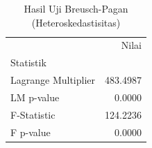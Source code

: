 \begin{table}[H]
\centering
\caption{Hasil Uji Breusch-Pagan (Heteroskedastisitas)}
\label{tab:bp_test}
\footnotesize
\begin{tabular}{lr}
\toprule
 & Nilai \\
Statistik &  \\
\midrule
Lagrange Multiplier & 483.4987 \\
LM p-value & 0.0000 \\
F-Statistic & 124.2236 \\
F p-value & 0.0000 \\
\bottomrule
\end{tabular}
\end{table}
